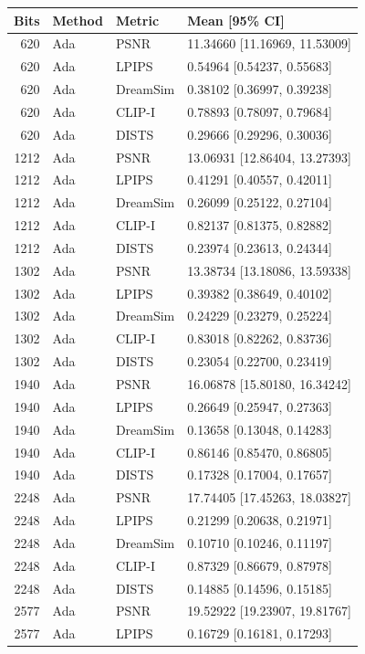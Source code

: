 \documentclass[10pt,letterpaper]{article}
\begin{document}
\begin{longtable}{@{}rlll@{}}\toprule
Bits & Method & Metric & Mean [95\% CI]\\\midrule\endhead
620 & Ada & PSNR & 11.34660 [11.16969, 11.53009]\\
620 & Ada & LPIPS & 0.54964 [0.54237, 0.55683]\\
620 & Ada & DreamSim & 0.38102 [0.36997, 0.39238]\\
620 & Ada & CLIP-I & 0.78893 [0.78097, 0.79684]\\
620 & Ada & DISTS & 0.29666 [0.29296, 0.30036]\\
1212 & Ada & PSNR & 13.06931 [12.86404, 13.27393]\\
1212 & Ada & LPIPS & 0.41291 [0.40557, 0.42011]\\
1212 & Ada & DreamSim & 0.26099 [0.25122, 0.27104]\\
1212 & Ada & CLIP-I & 0.82137 [0.81375, 0.82882]\\
1212 & Ada & DISTS & 0.23974 [0.23613, 0.24344]\\
1302 & Ada & PSNR & 13.38734 [13.18086, 13.59338]\\
1302 & Ada & LPIPS & 0.39382 [0.38649, 0.40102]\\
1302 & Ada & DreamSim & 0.24229 [0.23279, 0.25224]\\
1302 & Ada & CLIP-I & 0.83018 [0.82262, 0.83736]\\
1302 & Ada & DISTS & 0.23054 [0.22700, 0.23419]\\
1940 & Ada & PSNR & 16.06878 [15.80180, 16.34242]\\
1940 & Ada & LPIPS & 0.26649 [0.25947, 0.27363]\\
1940 & Ada & DreamSim & 0.13658 [0.13048, 0.14283]\\
1940 & Ada & CLIP-I & 0.86146 [0.85470, 0.86805]\\
1940 & Ada & DISTS & 0.17328 [0.17004, 0.17657]\\
2248 & Ada & PSNR & 17.74405 [17.45263, 18.03827]\\
2248 & Ada & LPIPS & 0.21299 [0.20638, 0.21971]\\
2248 & Ada & DreamSim & 0.10710 [0.10246, 0.11197]\\
2248 & Ada & CLIP-I & 0.87329 [0.86679, 0.87978]\\
2248 & Ada & DISTS & 0.14885 [0.14596, 0.15185]\\
2577 & Ada & PSNR & 19.52922 [19.23907, 19.81767]\\
2577 & Ada & LPIPS & 0.16729 [0.16181, 0.17293]\\

\end{longtable}
\end{document}
